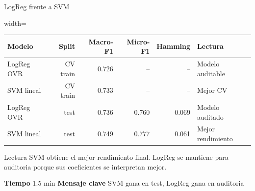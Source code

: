 \documentclass[aspectratio=169,10pt]{beamer}
\newcommand{\slidemeta}[2]{
  \vfill
  {\scriptsize\color{Muted}\textbf{Tiempo} #1 \hfill \textbf{Mensaje clave} #2}
}
\begin{document}
\begin{frame}{LogReg frente a SVM}
  \begin{adjustbox}{width=\linewidth}
    \begin{tabular}{lrrrrl}
      \toprule
      \textbf{Modelo} & \textbf{Split} & \textbf{Macro-F1} & \textbf{Micro-F1} & \textbf{Hamming} & \textbf{Lectura}\\
      \midrule
      LogReg OVR & CV train & 0.726 & -- & -- & Modelo auditable\\
      SVM lineal & CV train & 0.733 & -- & -- & Mejor CV\\
      LogReg OVR & test & 0.736 & 0.760 & 0.069 & Modelo auditado\\
      \rowcolor{Mint}
      SVM lineal & test & 0.749 & 0.777 & 0.061 & Mejor rendimiento\\
      \bottomrule
    \end{tabular}
  \end{adjustbox}
  \vspace{0.25cm}
  \begin{block}{Lectura}
    SVM obtiene el mejor rendimiento final. LogReg se mantiene para auditoria porque sus coeficientes se interpretan mejor.
  \end{block}
  \slidemeta{1.5 min}{SVM gana en test, LogReg gana en auditoria}
\end{frame}
\end{document}

